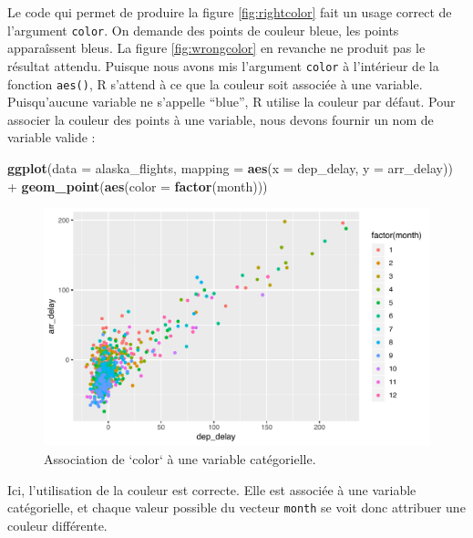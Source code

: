\documentclass[a4paperpaper,]{article}
\newenvironment{Shaded}{\begin{snugshade}}{\end{snugshade}}
\newcommand{\DataTypeTok}[1]{\textcolor[rgb]{0.00,0.34,0.68}{#1}}
\newcommand{\KeywordTok}[1]{\textcolor[rgb]{0.12,0.11,0.11}{\textbf{#1}}}
\newcommand{\NormalTok}[1]{\textcolor[rgb]{0.12,0.11,0.11}{#1}}
\newcommand{\OperatorTok}[1]{\textcolor[rgb]{0.12,0.11,0.11}{#1}}
\newcommand{\StringTok}[1]{\textcolor[rgb]{0.75,0.01,0.01}{#1}}
\begin{document}
Le code qui permet de produire la figure \ref{fig:rightcolor} fait un usage correct de l'argument \texttt{color}. On demande des points de couleur bleue, les points apparaîssent bleus. La figure \ref{fig:wrongcolor} en revanche ne produit pas le résultat attendu. Puisque nous avons mis l'argument \texttt{color} à l'intérieur de la fonction \texttt{aes()}, R s'attend à ce que la couleur soit associée à une variable. Puisqu'aucune variable ne s'appelle ``blue'', R utilise la couleur par défaut. Pour associer la couleur des points à une variable, nous devons fournir un nom de variable valide :

\begin{Shaded}
\begin{Highlighting}[]
\KeywordTok{ggplot}\NormalTok{(}\DataTypeTok{data =}\NormalTok{ alaska_flights, }\DataTypeTok{mapping =} \KeywordTok{aes}\NormalTok{(}\DataTypeTok{x =}\NormalTok{ dep_delay, }\DataTypeTok{y =}\NormalTok{ arr_delay)) }\OperatorTok{+}
\StringTok{  }\KeywordTok{geom_point}\NormalTok{(}\KeywordTok{aes}\NormalTok{(}\DataTypeTok{color =} \KeywordTok{factor}\NormalTok{(month)))}
\end{Highlighting}
\end{Shaded}

\begin{figure}[htpb]

{\centering \includegraphics[width=0.9\linewidth]{figure/varcolor-1} 

}

\caption{Association de `color` à une variable catégorielle.}\label{fig:varcolor}
\end{figure}

Ici, l'utilisation de la couleur est correcte. Elle est associée à une variable catégorielle, et chaque valeur possible du vecteur \texttt{month} se voit donc attribuer une couleur différente.
\end{document}
